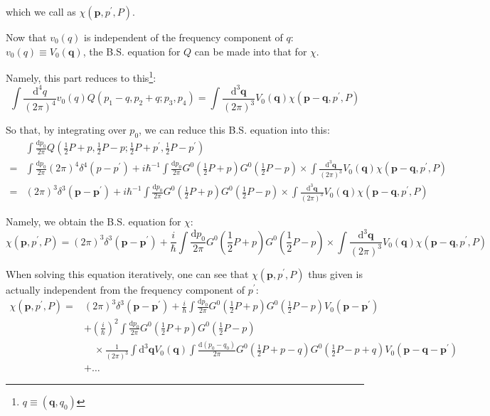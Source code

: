 which we call as $\chi(\mathbf{p},p^{'},P)$.

Now that $v_0(q)$ is independent of the frequency component of $q$: $v_0(q) \equiv V_0(\mathbf{q})$, the B.S. equation for $Q$ can be made into that for $\chi$.

Namely, this part reduces to this\footnote{$q \equiv (\mathbf{q},q_0)$}:
\[ \int \frac{\mathrm{d}^4 q}{(2\pi)^4} v_0(q) Q(p_1-q,p_2+q;p_3,p_4) = \int \frac{\mathrm{d}^3 \mathbf{q}}{(2\pi)^3} V_0(\mathbf{q}) \chi(\mathbf{p}-\mathbf{q}, p^{'}, P) \]

So that, by integrating over $p_0$, we can reduce this B.S. equation into this:
\[ \begin{split}
&\int \frac{\mathrm{d}p_0}{2\pi} Q(\frac{1}{2}P+p,\frac{1}{2}P-p;\frac{1}{2}P+p^{'},\frac{1}{2}P-p^{'})\\
= &\int \frac{\mathrm{d}p_0}{2\pi} (2\pi)^4 \delta^4(p-p^{'}) + i \hbar^{-1} \int \frac{\mathrm{d}p_0}{2\pi} G^0(\frac{1}{2}P+p)G^0(\frac{1}{2}P-p) \times \int \frac{\mathrm{d}^3\mathbf{q}}{(2\pi)^3} V_0(\mathbf{q})\chi(\mathbf{p}-\mathbf{q},p^{'},P)\\
=&(2\pi)^3 \delta^3(\mathbf{p}-\mathbf{p}^{'}) + i \hbar^{-1} \int \frac{\mathrm{d}p_0}{2\pi} G^0(\frac{1}{2}P+p)G^0(\frac{1}{2}P-p) \times \int \frac{\mathrm{d}^3\mathbf{q}}{(2\pi)^3} V_0(\mathbf{q})\chi(\mathbf{p}-\mathbf{q},p^{'},P)
\end{split} \]

Namely, we obtain the B.S. equation for $\chi$:
\begin{equation} \label{Eqs2.7.13}
\chi(\mathbf{p},p^{'},P) = (2\pi)^3 \delta^3(\mathbf{p}-\mathbf{p}^{'}) + \frac{i}{\hbar} \int \frac{\mathrm{d}p_0}{2\pi} G^0(\frac{1}{2}P+p)G^0(\frac{1}{2}P-p)\times\int\frac{\mathrm{d}^3 \mathbf{q}}{(2\pi)^3}V_0(\mathbf{q}) \chi(\mathbf{p}-\mathbf{q},p^{'},P)
\end{equation}

When solving this equation iteratively, one can see that $\chi(\mathbf{p},p^{'},P)$ thus given is actually independent from the frequency component of $p^{'}$:
\[ \begin{split} \chi(\mathbf{p},p^{'},P) =& (2\pi)^3\delta^3(\mathbf{p}-\mathbf{p}^{'})+\frac{i}{\hbar} \int \frac{\mathrm{d}p_0}{2\pi}G^0(\frac{1}{2}P+p)G^0(\frac{1}{2}P-p)V_0(\mathbf{p}-\mathbf{p}^{'})\\
&+\left(\frac{i}{\hbar}\right)^2 \int \frac{\mathrm{d}p_0}{2\pi}G^0(\frac{1}{2}P+p)G^0(\frac{1}{2}P-p) \\
&\quad \times \frac{1}{(2\pi)^3} \int \mathrm{d}^3\mathbf{q}V_0(\mathbf{q}) \int \frac{\mathrm{d}(p_0-q_0)}{2\pi}G^0(\frac{1}{2}P+p-q)G^0(\frac{1}{2}P-p+q)V_0(\mathbf{p}-\mathbf{q}-\mathbf{p}^{'})\\
&+ \ldots
\end{split} \]

